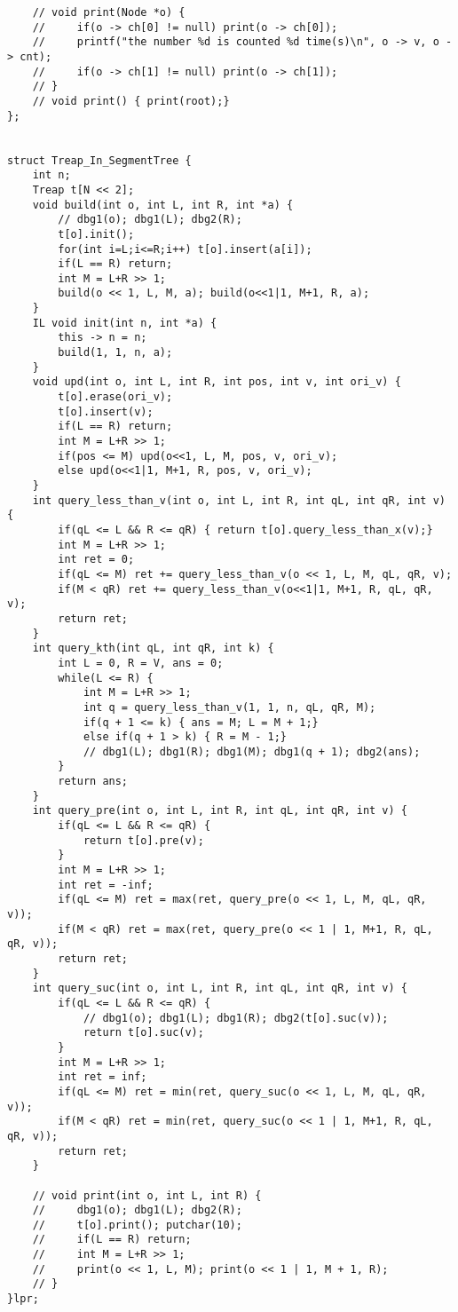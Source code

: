 \documentclass[UTF8]{ctexart}
\begin{document}
\begin{framed}
\begin{lstlisting}
    // void print(Node *o) {
    //     if(o -> ch[0] != null) print(o -> ch[0]);
    //     printf("the number %d is counted %d time(s)\n", o -> v, o -> cnt);
    //     if(o -> ch[1] != null) print(o -> ch[1]);
    // }
    // void print() { print(root);}
};


struct Treap_In_SegmentTree {
    int n;
    Treap t[N << 2];
    void build(int o, int L, int R, int *a) {
        // dbg1(o); dbg1(L); dbg2(R);
        t[o].init();
        for(int i=L;i<=R;i++) t[o].insert(a[i]);
        if(L == R) return;
        int M = L+R >> 1;
        build(o << 1, L, M, a); build(o<<1|1, M+1, R, a);
    }
    IL void init(int n, int *a) {
        this -> n = n;
        build(1, 1, n, a);
    }
    void upd(int o, int L, int R, int pos, int v, int ori_v) {
        t[o].erase(ori_v);
        t[o].insert(v);
        if(L == R) return;
        int M = L+R >> 1;
        if(pos <= M) upd(o<<1, L, M, pos, v, ori_v);
        else upd(o<<1|1, M+1, R, pos, v, ori_v);
    }
    int query_less_than_v(int o, int L, int R, int qL, int qR, int v) {
        if(qL <= L && R <= qR) { return t[o].query_less_than_x(v);}
        int M = L+R >> 1;
        int ret = 0;
        if(qL <= M) ret += query_less_than_v(o << 1, L, M, qL, qR, v);
        if(M < qR) ret += query_less_than_v(o<<1|1, M+1, R, qL, qR, v);
        return ret;
    }
    int query_kth(int qL, int qR, int k) {
        int L = 0, R = V, ans = 0;
        while(L <= R) {
            int M = L+R >> 1;
            int q = query_less_than_v(1, 1, n, qL, qR, M);
            if(q + 1 <= k) { ans = M; L = M + 1;}
            else if(q + 1 > k) { R = M - 1;}
            // dbg1(L); dbg1(R); dbg1(M); dbg1(q + 1); dbg2(ans);
        }
        return ans;
    }
    int query_pre(int o, int L, int R, int qL, int qR, int v) {
        if(qL <= L && R <= qR) {
            return t[o].pre(v);
        }
        int M = L+R >> 1;
        int ret = -inf;
        if(qL <= M) ret = max(ret, query_pre(o << 1, L, M, qL, qR, v));
        if(M < qR) ret = max(ret, query_pre(o << 1 | 1, M+1, R, qL, qR, v));
        return ret;
    }
    int query_suc(int o, int L, int R, int qL, int qR, int v) {
        if(qL <= L && R <= qR) {
            // dbg1(o); dbg1(L); dbg1(R); dbg2(t[o].suc(v));
            return t[o].suc(v);
        }
        int M = L+R >> 1;
        int ret = inf;
        if(qL <= M) ret = min(ret, query_suc(o << 1, L, M, qL, qR, v));
        if(M < qR) ret = min(ret, query_suc(o << 1 | 1, M+1, R, qL, qR, v));
        return ret;
    }

    // void print(int o, int L, int R) {
    //     dbg1(o); dbg1(L); dbg2(R);
    //     t[o].print(); putchar(10);
    //     if(L == R) return;
    //     int M = L+R >> 1;
    //     print(o << 1, L, M); print(o << 1 | 1, M + 1, R);
    // }
}lpr;


\end{lstlisting}
\end{framed}
\end{document}
